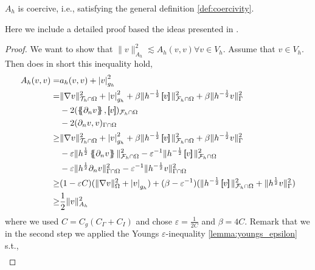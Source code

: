 \begin{lemma}
    \label{lemma:Ah_coercive}
    $A_{h}$ is coercive, i.e., satisfying the general definition \ref{def:coercivity}.
\end{lemma}
    Here we include a detailed proof based the ideas presented in \cite{gurkan2019stabilized}.
\begin{proof}
We want to show that $  \| v \|_{A_{h}}^{2}   \lesssim A_{h}( v,v) \forall v \in V_{h} $.
    Assume that $v \in V_{h} $. Then does in short this inequality hold,
\[
    \begin{split}
A_{h}( v, v)   =& a_{h}( v, v) + \abs{ v }  _{g_{h}}^{2} \\
=&  \| \nabla v \|_{  \mathcal{T}_{h} \cap \Omega }^{ 2 } + \abs{v  }  _{ g_{h} }^{ 2 } + \beta \| h^{-\frac{1}{2}} \jump{ v }   \|_{\mathcal{F} _{h} \cap \Omega   }^{  2}   + \beta \| h^{-\frac{1}{2}}  v    \|_{ \Gamma}^{  2}
\\ & - 2( \mean{ \partial _{n} v  },  \jump{ v })_{\mathcal{F} _{h} \cap \Omega }
\\ & - 2 ( \partial _{n} v,v)_{\Gamma \cap \Omega }     \\
\ge  &  \| \nabla v \|_{  \mathcal{T}_{h} \cap \Omega }^{ 2 } + \left\lvert v \right\rvert_{ g_{h} }^{ 2 } + \beta \| h^{-\frac{1}{2}} \jump{ v }   \|_{\mathcal{F} _{h} \cap \Omega   }^{2  }   + \beta \| h^{-\frac{1}{2}}  v    \|_{ \Gamma}^{  2}
\\ & - \varepsilon \| h^{\frac{1}{2}}  \mean{  \partial _{n} v}      \|_{ \mathcal{F} _{h} \cap \Omega  }^{2  } - \varepsilon ^{-1} \| h^{-\frac{1}{2}} \jump{ v }   \|_{\mathcal{F} _{h} \cap \Omega   }^{ 2 }
\\ & - \varepsilon \| h^{\frac{1}{2}} \partial _{n} v \|_{ \Gamma \cap \Omega  }^{2  } -  \varepsilon ^{-1} \| h^{-\frac{1}{2}} v \|_{  \Gamma \cap  \Omega }^{ 2 } \\
\ge & ( 1-\varepsilon C)  ( \| \nabla v \|_{\Omega   }^{2  } + \left\lvert v \right\rvert _{g_{h}}   ) + ( \beta - \varepsilon ^{-1} ) ( \| h^{-\frac{1}{2}} \jump{ v }   \|_{ \mathcal{F} _{h}\cap  \Omega  }^{ 2 } + \| h^{\frac{1}{2}} v \|_{\Gamma
}^{  2}  )    \\
\ge & \frac{1}{2} \| v \|_{ A_{h} }^{ 2 }
    \end{split}
\]
where we used $C= C_{g} ( C_{\Gamma } + C_{I}) $ and chose $\varepsilon = \frac{1}{2C}$ and $\beta  = 4C$.
Remark that we in the second step we applied the Youngs $\varepsilon $-inequality \ref{lemma:youngs_epsilon} s.t.,
 \[
     \begin{split}

\end{split}\]
\end{proof}
